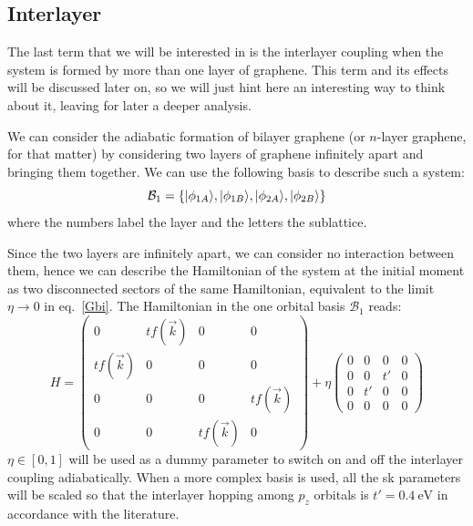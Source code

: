 \subsection{Interlayer}
The last term that we will be interested in is the interlayer coupling when the system is formed by more than one layer of graphene. This term and its effects will be discussed later on, so we will just hint here an interesting way to think about it, leaving for later a deeper analysis.

We can consider the adiabatic formation of bilayer graphene (or $n$-layer graphene, for that matter) by considering two layers of graphene infinitely apart and bringing them together.
We can use the following basis to describe such a system:
\begin{equation}
  \mathcal{B}_1 = \left\{|\phi_{1A}\rangle, |\phi_{1B}\rangle,
                        |\phi_{2A}\rangle, |\phi_{2B}\rangle\right\}
\label{basis_bi}
\end{equation}
where the numbers label the layer and the letters the sublattice.

Since the two layers are infinitely apart, we can consider no interaction between them, hence we can describe the Hamiltonian of the system at the initial moment as two disconnected sectors of the same Hamiltonian, equivalent to the limit $\eta\rightarrow0$ in eq.~\eqref{Gbi}. The Hamiltonian in the one orbital basis $\mathcal{B}_1$ reads:
\begin{equation}
  H = \left(\begin{array}{cc|cc}
     0 & tf(\vec{k}) & 0 & 0 \\
     tf(\vec{k}) & 0 & 0 & 0 \\ \hline
     0 & 0 & 0 & tf(\vec{k}) \\
     0 & 0 & tf(\vec{k}) & 0
  \end{array}\right) + 
  \eta \left(\begin{array}{cc|cc}
     0 & 0  & 0  & 0 \\
     0 & 0  & t' & 0 \\ \hline
     0 & t' & 0  & 0 \\
     0 & 0  & 0  & 0
  \end{array}\right)
\label{Gbi}
\end{equation}
$\eta\in[0,1]$ will be used as a dummy parameter to switch on and off the interlayer coupling adiabatically.
When a more complex basis is used, all the \ac{sk} parameters will be scaled so that the interlayer hopping among $p_z$ orbitals is $t'=\SI{0.4}{\eV}$ in accordance with the literature\cite{KatsnelsonBook}.



